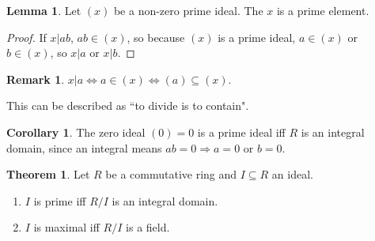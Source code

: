\documentclass[12pt,a4paper]{article}
\theoremstyle{definition}
\newtheorem{theorem}[definition]{Theorem}
\newtheorem{corollary}[definition]{Corollary}
\newtheorem{lemma}[definition]{Lemma}
\newtheorem*{remark}{Remark}
\begin{document}
\begin{lemma}
	Let $(x)$ be a non-zero prime ideal. The $x$ is a prime element.
\end{lemma}

\begin{proof}
	If $x | ab$, $ab \in (x)$, so because $(x)$ is a prime ideal, $a \in (x)$ or $b \in (x)$, so $x | a$ or $x | b$.
\end{proof}

\begin{remark}
	$x | a \Leftrightarrow a \in (x) \Leftrightarrow (a) \subseteq (x)$.

	This can be described as ``to divide is to contain".
\end{remark}

\begin{corollary}
	The zero ideal $(0) = 0$ is a prime ideal iff $R$ is an integral domain, since an integral means $ab = 0 \Rightarrow a = 0 \text{ or } b = 0$.
\end{corollary}

\begin{theorem}
	Let $R$ be a commutative ring and $I \subseteq R$ an ideal.

	\begin{enumerate}
		\item $I$ is prime iff $R / I$ is an integral domain.
		\item $I$ is maximal iff $R / I$ is a field.
	\end{enumerate}
\end{theorem}
\end{document}
